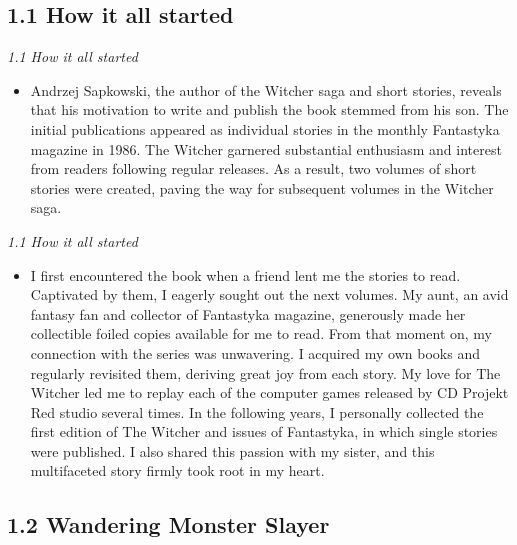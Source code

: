 \documentclass[xcolor=dvipsnames]{beamer}
\begin{document}
\subsection{1.1 How it all started}
\begin{frame}{\textit{1.1 How it all started}}
    \begin{itemize}
        \item Andrzej Sapkowski, the author of the Witcher saga and short stories, reveals that his motivation to write and publish the book stemmed from his son. The initial publications appeared as individual stories in the monthly Fantastyka magazine in 1986. The Witcher garnered substantial enthusiasm and interest from readers following regular releases. As a result, two volumes of short stories were created, paving the way for subsequent volumes in the Witcher saga.
        \end{itemize}
    
\end{frame}

\begin{frame}{\textit{1.1 How it all started}}
    \begin{itemize}
        \item I first encountered the book when a friend lent me the stories to read. Captivated by them, I eagerly sought out the next volumes. My aunt, an avid fantasy fan and collector of Fantastyka magazine, generously made her collectible foiled copies available for me to read. From that moment on, my connection with the series was unwavering. I acquired my own books and regularly revisited them, deriving great joy from each story. My love for The Witcher led me to replay each of the computer games released by CD Projekt Red studio several times. In the following years, I personally collected the first edition of The Witcher and issues of Fantastyka, in which single stories were published. I also shared this passion with my sister, and this multifaceted story firmly took root in my heart.
    \end{itemize}
    
\end{frame}

\subsection{1.2 Wandering Monster Slayer}
\end{document}

